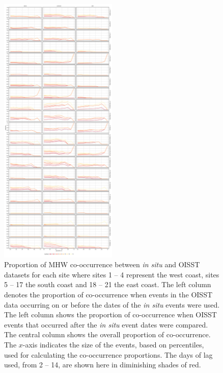 \documentclass[a4paper,10pt,review]{elsarticle}
\begin{document}
\begin{figure}
\centering \includegraphics[width=0.5\textwidth]{figure4.pdf}
\caption{Proportion of MHW co-occurrence between \emph{in situ} and OISST datasets for each site where sites 1 -- 4 represent the west coast, sites 5 -- 17 the south coast and 18 -- 21 the east coast. The left column denotes the proportion of co-occurrence when events in the OISST data occurring on or before the dates of the \emph{in situ} events were used. The left column shows the proportion of co-occurrence when OISST events that occurred after the \emph{in situ} event dates were compared. The central column shows the overall proportion of co-occurrence. The $x$-axis indicates the size of the events, based on percentiles, used for calculating the co-occurrence proportions. The days of lag used, from 2 -- 14, are shown here in diminishing shades of red.} \label{fig:Figure4}
\end{figure}
\end{document}
